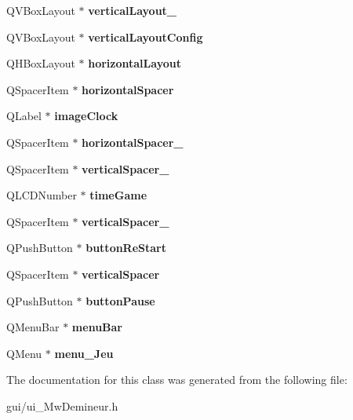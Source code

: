 \begin{DoxyCompactItemize}
Q\+V\+Box\+Layout $\ast$ {\bfseries vertical\+Layout\+\_}
\item 
\mbox{\label{class_ui___mw_demineur_a20a7be26c6716bc5cc4ca1cf23b756c5}} 
Q\+V\+Box\+Layout $\ast$ {\bfseries vertical\+Layout\+Config}
\item 
\mbox{\label{class_ui___mw_demineur_ab3095fbeeddb82d13cd892854382a014}} 
Q\+H\+Box\+Layout $\ast$ {\bfseries horizontal\+Layout}
\item 
\mbox{\label{class_ui___mw_demineur_ad729ef9f123ecdf50a594f62f4ef2706}} 
Q\+Spacer\+Item $\ast$ {\bfseries horizontal\+Spacer}
\item 
\mbox{\label{class_ui___mw_demineur_abeccd17978c2ae32c9dcfaafaf2f87e4}} 
Q\+Label $\ast$ {\bfseries image\+Clock}
\item 
\mbox{\label{class_ui___mw_demineur_a2329c27b104a634bbb6dc9fbd9a7ea3a}} 
Q\+Spacer\+Item $\ast$ {\bfseries horizontal\+Spacer\+\_}
\item 
\mbox{\label{class_ui___mw_demineur_a5a692cabe942ae309bc23556d49e4f93}} 
Q\+Spacer\+Item $\ast$ {\bfseries vertical\+Spacer\+\_}
\item 
\mbox{\label{class_ui___mw_demineur_a748cc3ef9fdea4c77ee1895d21f6057a}} 
Q\+L\+C\+D\+Number $\ast$ {\bfseries time\+Game}
\item 
\mbox{\label{class_ui___mw_demineur_a39698211d4758358728ee24af0cc6a9a}} 
Q\+Spacer\+Item $\ast$ {\bfseries vertical\+Spacer\+\_}
\item 
\mbox{\label{class_ui___mw_demineur_ac662fe829babc2ba70b771409d0a41bd}} 
Q\+Push\+Button $\ast$ {\bfseries button\+Re\+Start}
\item 
\mbox{\label{class_ui___mw_demineur_a0c034fe35ce5ccca33aebeea75d0b0c6}} 
Q\+Spacer\+Item $\ast$ {\bfseries vertical\+Spacer}
\item 
\mbox{\label{class_ui___mw_demineur_aef714f6d4abce4bbc9ec4a940f869ceb}} 
Q\+Push\+Button $\ast$ {\bfseries button\+Pause}
\item 
\mbox{\label{class_ui___mw_demineur_af31940bb40286795718d08b0825f448c}} 
Q\+Menu\+Bar $\ast$ {\bfseries menu\+Bar}
\item 
\mbox{\label{class_ui___mw_demineur_a26b0de34fb57c07809fbe2c7bebcbf8f}} 
Q\+Menu $\ast$ {\bfseries menu\+\_\+\+Jeu}
\end{DoxyCompactItemize}


The documentation for this class was generated from the following file\+:\begin{DoxyCompactItemize}
\item 
gui/ui\+\_\+\+Mw\+Demineur.\+h\end{DoxyCompactItemize}
